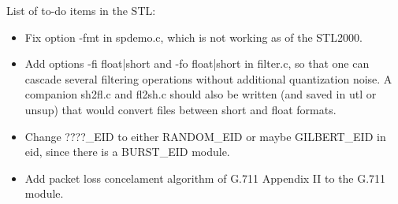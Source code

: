 List of to-do items in the STL:
\begin{itemize}
 \item	Fix option -fmt in spdemo.c, which is not working as of the
	STL2000.

 \item	Add options -fi float|short and -fo float|short in filter.c, 
	so that one can cascade several filtering operations without
	additional quantization noise. A companion sh2fl.c and fl2sh.c
	should also be written (and saved in utl or unsup) that would
	convert files between short and float formats.

 \item	Change ????\_EID to either RANDOM\_EID or maybe GILBERT\_EID
	in eid, since there is a BURST\_EID module.

 \item	Add packet loss concelament algorithm of G.711 Appendix II 
	to the G.711 module.
\end{itemize}
